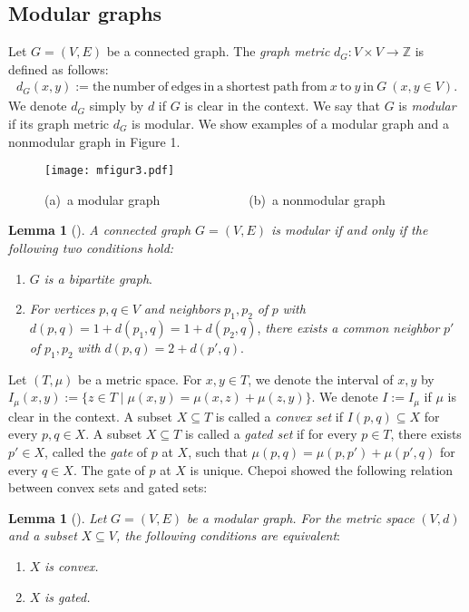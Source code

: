 \documentclass[11pt]{article}
\theoremstyle{definition}
\newtheorem{lemma}[theorem]{Lemma}
\begin{document}
\subsection{Modular graphs}
Let $G=(V,E)$ be a connected graph. The \textit{graph metric} $d_G:V\times V\rightarrow \mathbb{Z}$ is defined as follows:
\begin{align}
\label{graph metric}
    d_G(x,y):=\mathrm{the\ number\ of\ edges\ in\ a\ shortest\ path\ from}\ x\ \mathrm{to}\ y\ \mathrm{in}\ G\ (x,y\in V).
\end{align}
We denote $d_G$ simply by $d$ if $G$ is clear in the context. We say that $G$ is \textit{modular} if its graph metric $d_G$ is modular. We show examples of a modular graph and a nonmodular graph in Figure 1.
\begin{figure}[tbp]
\begin{center}
\texttt{[image: mfigur3.pdf]}
\caption{(a)\ a modular graph\ \ \ \ \ \ \ \ \ \ \ \ \ \ (b)\ a nonmodular graph}
\end{center}
\end{figure}
\begin{lemma}[\cite{bandelt1993}]
\label{modularcondition}
\textit{A connected graph $G=(V,E)$ is modular if and only if  the following two conditions hold:}
\begin{enumerate}[label=(\roman*),ref=\roman*]
    \item $G$ \textit{is a bipartite graph}.
    \item \textit{For vertices} $p,q\in V$ \textit{and neighbors} $p_1,p_2$ \textit{of} $p$ \textit{with} $d(p,q)=1+d(p_1,q)=1+d(p_2,q)$, \textit{there exists a common neighbor} $p'$ \textit{of} $p_1,p_2$ \textit{with} $d(p,q)=2+d(p',q)$.
\end{enumerate}
\end{lemma}

Let $(T,\mu)$ be a metric space. For $x,y\in T$, we denote the interval of $x,y$ by $I_\mu(x,y):=\{z\in T\mid \mu(x,y)=\mu(x,z)+\mu(z,y)\}$. We denote $I:=I_\mu$ if $\mu$ is clear in the context. A subset $X\subseteq T$ is called a \textit{convex set} if $I(p,q)\subseteq X$ for every $p,q\in X$. A subset $X\subseteq T$ is called a \textit{gated set} if for every $p\in T$, there exists $p'\in X$, called the \textit{gate} of $p$ at $X$, such that $\mu(p,q)=\mu(p,p')+\mu(p',q)$ for every $q\in X$. The gate of $p$ at $X$ is unique. Chepoi \cite{chepoi1989} showed the following relation between convex sets and gated sets:
\begin{lemma}[\cite{chepoi1989}]
\label{gated}
\textit{Let }$G=(V,E)$ \textit{be a modular graph. For the metric space} $(V,d)$ \textit{and a subset} $X\subseteq V$\textit{, the following conditions are equivalent}:
\begin{enumerate}[label=(\roman*),ref=\roman*]
    \item $X$ \textit{is convex.}
    \item $X$ \textit{is gated.}
\end{enumerate}
\end{lemma}
\end{document}

